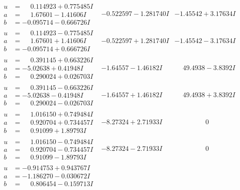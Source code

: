 \documentclass[1p]{elsarticle_modified}
\theoremstyle{definition}
\begin{document}
$$\begin{array}{c|c|c}
\begin{aligned}
u &= \phantom{-}0.114923 + 0.775485 I \\
a &= \phantom{-}1.67601 - 1.41606 I \\
b &= -0.095714 - 0.666726 I\end{aligned}
 & -0.522597 - 1.281740 I & -1.45542 + 3.17634 I \\ \hline\begin{aligned}
u &= \phantom{-}0.114923 - 0.775485 I \\
a &= \phantom{-}1.67601 + 1.41606 I \\
b &= -0.095714 + 0.666726 I\end{aligned}
 & -0.522597 + 1.281740 I & -1.45542 - 3.17634 I \\ \hline\begin{aligned}
u &= \phantom{-}0.391145 + 0.663226 I \\
a &= -5.02638 + 0.41948 I \\
b &= \phantom{-}0.290024 + 0.026703 I\end{aligned}
 & -1.64557 - 1.46182 I & \phantom{-}49.4938 - 3.8392 I \\ \hline\begin{aligned}
u &= \phantom{-}0.391145 - 0.663226 I \\
a &= -5.02638 - 0.41948 I \\
b &= \phantom{-}0.290024 - 0.026703 I\end{aligned}
 & -1.64557 + 1.46182 I & \phantom{-}49.4938 + 3.8392 I \\ \hline\begin{aligned}
u &= \phantom{-}1.016150 + 0.749484 I \\
a &= \phantom{-}0.920704 + 0.734457 I \\
b &= \phantom{-}0.91099 + 1.89793 I\end{aligned}
 & -8.27324 + 2.71933 I & \phantom{-0.000000 } 0 \\ \hline\begin{aligned}
u &= \phantom{-}1.016150 - 0.749484 I \\
a &= \phantom{-}0.920704 - 0.734457 I \\
b &= \phantom{-}0.91099 - 1.89793 I\end{aligned}
 & -8.27324 - 2.71933 I & \phantom{-0.000000 } 0 \\ \hline\begin{aligned}
u &= -0.914753 + 0.943767 I \\
a &= -1.186270 - 0.030672 I \\
b &= \phantom{-}0.806454 - 0.159713 I\end{aligned}

\end{array}$$
\end{document}
